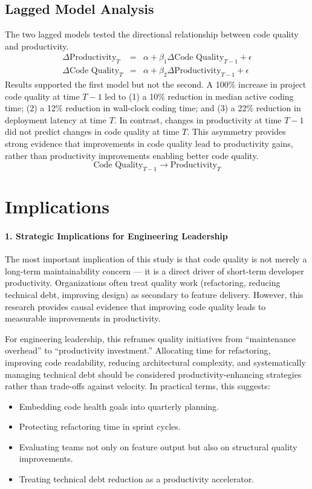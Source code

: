 \subsection{Lagged Model Analysis}
The two lagged models tested the directional relationship between code quality and productivity.
\begin{eqnarray}
    \Delta \text{Productivity}_{T} &=& \alpha + \beta_1 \Delta \text{Code Quality}_{T-1} + \epsilon \\
    \Delta \text{Code Quality}_{T} &=& \alpha + \beta_2 \Delta \text{Productivity}_{T-1} + \epsilon
\end{eqnarray}
Results supported the first model but not the second. A 100\% increase in project code quality at time $T-1$ led to (1) a 10\% reduction in median active coding time; (2) a 12\% reduction in wall-clock coding time; and (3) a 22\% reduction in deployment latency at time $T$. In contrast, changes in productivity at time $T-1$ did not predict changes in code quality at time $T$. This asymmetry provides strong evidence that improvements in code quality lead to productivity gains, rather than productivity improvements enabling better code quality.
\begin{equation}
    \text{Code Quality}_{T-1} \rightarrow \text{Productivity}_{T}
\end{equation}

\section{Implications}
\paragraph{1. Strategic Implications for Engineering Leadership}
The most important implication of this study is that code quality is not merely a long-term maintainability concern — it is a direct driver of short-term developer productivity. Organizations often treat quality work (refactoring, reducing technical debt, improving design) as secondary to feature delivery. However, this research provides causal evidence that improving code quality leads to measurable improvements in productivity.

For engineering leadership, this reframes quality initiatives from “maintenance overhead” to “productivity investment.” Allocating time for refactoring, improving code readability, reducing architectural complexity, and systematically managing technical debt should be considered productivity-enhancing strategies rather than trade-offs against velocity. In practical terms, this suggests:
\begin{itemize}
    \item Embedding code health goals into quarterly planning.
    \item Protecting refactoring time in sprint cycles.
    \item Evaluating teams not only on feature output but also on structural quality improvements.
    \item Treating technical debt reduction as a productivity accelerator.
\end{itemize}

